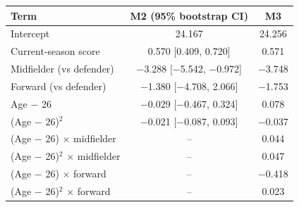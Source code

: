 \begin{tabular}{lcc}
\toprule
Term & M2 (95\% bootstrap CI) & M3 \\
\midrule
Intercept & 24.167 & 24.256 \\
Current-season score & 0.570 [0.409, 0.720] & 0.571 \\
Midfielder (vs defender) & $-$3.288 [$-$5.542, $-$0.972] & $-$3.748 \\
Forward (vs defender) & $-$1.380 [$-$4.708, 2.066] & $-$1.753 \\
Age $-$ 26 & $-$0.029 [$-$0.467, 0.324] & 0.078 \\
(Age $-$ 26)$^2$ & $-$0.021 [$-$0.087, 0.093] & $-$0.037 \\
(Age $-$ 26) $\times$ midfielder & -- & 0.044 \\
(Age $-$ 26)$^2$ $\times$ midfielder & -- & 0.047 \\
(Age $-$ 26) $\times$ forward & -- & $-$0.418 \\
(Age $-$ 26)$^2$ $\times$ forward & -- & 0.023 \\
\bottomrule
\end{tabular}
